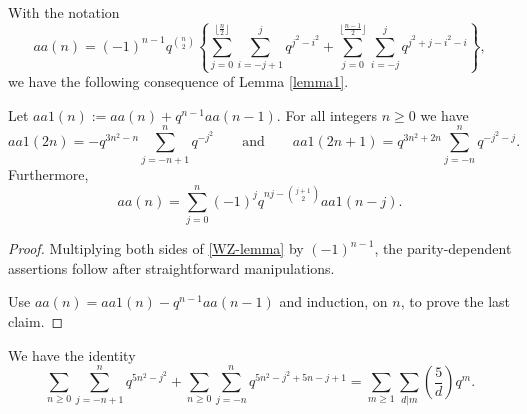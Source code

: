 \documentclass[a4paper,reqno,12pt]{amsart}
\begin{document}
\smallskip
\noindent
With the notation
$$aa(n)=(-1)^{n-1} q^{\binom{n}2} 
\left\{ \sum _{j=0}^{\lfloor\frac{n}2\rfloor}\sum_{i=-j+1}^j q^{j^2-i^2} +  
\sum _{j=0}^{\lfloor\frac{n-1}2\rfloor}\sum_{i=-j}^j q^{j^2+j-i^2-i} \right\},$$ we have the following consequence of Lemma \ref{lemma1}.

\begin{corollary} \label{cor1} Let $aa1(n):=aa(n)+q^{n-1}aa(n-1)$. For all   integers $n\geq0$ we have 
$$aa1(2n)=-q^{3n^2-n}\sum_{j=-n+1}^n q^{-j^2} \qquad \text{and} \qquad
aa1(2n+1)=q^{3n^2+2n}\sum_{j=-n}^n q^{-j^2-j}.$$
Furthermore, 
$$aa(n)=\sum_{j=0}^n (-1)^jq^{nj-\binom{j+1}2} aa1(n-j).$$
\end{corollary}

\begin{proof} Multiplying both sides of \eqref{WZ-lemma} by $(-1)^{n-1}$,  the parity-dependent assertions follow after straightforward manipulations.

\smallskip
\noindent
Use $aa(n)=aa1(n)-q^{n-1}aa(n-1)$ and induction, on $n$, to prove the last claim.
\end{proof}



\begin{lemma} \label{lemma2} We have the identity
\begin{equation} \label{lemma2_eq} \sum_{n\geq0}\sum_{j=-n+1}^n   q^{5n^2-j^2} + \sum_{n\geq0}  \sum_{j=-n}^n q^{5n^2-j^2+5n-j+1}
=\sum_{m\geq1} \sum_{d\vert m} \left(\frac{5}d\right)q^m. \end{equation}
\end{lemma}
\end{document}
